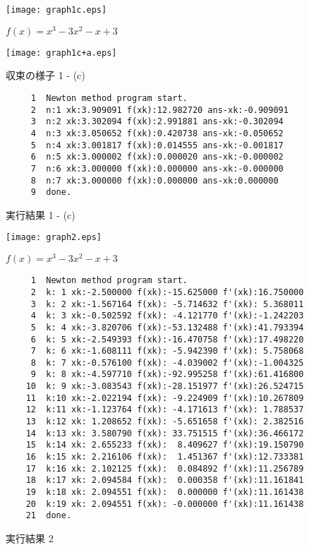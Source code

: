 \documentclass[12pt]{jarticle}
\renewcommand  \[  {\begin{eqnarray}}
\renewcommand  \]  {\end{eqnarray}}
\begin{document}
\begin{figure}[t]
 \begin{minipage}{7.95cm}
  \center
  \texttt{[image: graph1c.eps]}
  \caption{$f(x)=x^3-3x^2-x+3$}
  \label{fig:1c}
 \end{minipage}
 \begin{minipage}{7.95cm}
  \center
  \texttt{[image: graph1c+a.eps]}
  \caption{収束の様子 1 - (c)}
  \label{fig:1c+a}
 \end{minipage}
\begin{screen}
\begin{verbatim}
     1	Newton method program start.
     2	n:1 xk:3.909091 f(xk):12.982720 ans-xk:-0.909091
     3	n:2 xk:3.302094 f(xk):2.991881 ans-xk:-0.302094
     4	n:3 xk:3.050652 f(xk):0.420738 ans-xk:-0.050652
     5	n:4 xk:3.001817 f(xk):0.014555 ans-xk:-0.001817
     6	n:5 xk:3.000002 f(xk):0.000020 ans-xk:-0.000002
     7	n:6 xk:3.000000 f(xk):0.000000 ans-xk:-0.000000
     8	n:7 xk:3.000000 f(xk):0.000000 ans-xk:0.000000
     9	done.
\end{verbatim}
\end{screen}
\caption{実行結果 1 - (c)}
\label{fig:1cc}
\end{figure}

\begin{figure}[t]
  \center
  \texttt{[image: graph2.eps]}
  \caption{$f(x)=x^3-3x^2-x+3$}
  \label{fig:2}
\begin{screen}
\begin{verbatim}
     1	Newton method program start.
     2	k: 1 xk:-2.500000 f(xk):-15.625000 f'(xk):16.750000
     3	k: 2 xk:-1.567164 f(xk): -5.714632 f'(xk): 5.368011
     4	k: 3 xk:-0.502592 f(xk): -4.121770 f'(xk):-1.242203
     5	k: 4 xk:-3.820706 f(xk):-53.132488 f'(xk):41.793394
     6	k: 5 xk:-2.549393 f(xk):-16.470758 f'(xk):17.498220
     7	k: 6 xk:-1.608111 f(xk): -5.942390 f'(xk): 5.758068
     8	k: 7 xk:-0.576100 f(xk): -4.039002 f'(xk):-1.004325
     9	k: 8 xk:-4.597710 f(xk):-92.995258 f'(xk):61.416800
    10	k: 9 xk:-3.083543 f(xk):-28.151977 f'(xk):26.524715
    11	k:10 xk:-2.022194 f(xk): -9.224909 f'(xk):10.267809
    12	k:11 xk:-1.123764 f(xk): -4.171613 f'(xk): 1.788537
    13	k:12 xk: 1.208652 f(xk): -5.651658 f'(xk): 2.382516
    14	k:13 xk: 3.580790 f(xk): 33.751515 f'(xk):36.466172
    15	k:14 xk: 2.655233 f(xk):  8.409627 f'(xk):19.150790
    16	k:15 xk: 2.216106 f(xk):  1.451367 f'(xk):12.733381
    17	k:16 xk: 2.102125 f(xk):  0.084892 f'(xk):11.256789
    18	k:17 xk: 2.094584 f(xk):  0.000358 f'(xk):11.161841
    19	k:18 xk: 2.094551 f(xk):  0.000000 f'(xk):11.161438
    20	k:19 xk: 2.094551 f(xk): -0.000000 f'(xk):11.161438
    21	done.
\end{verbatim}
\end{screen}
\caption{実行結果 2}
\label{fig:22}
\end{figure}
\end{document}
